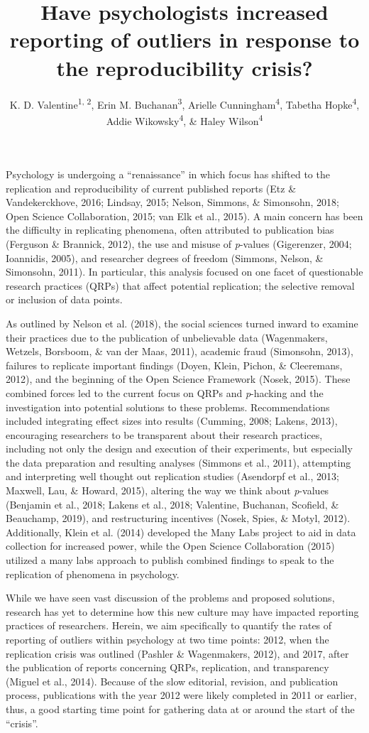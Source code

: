 \documentclass[english,,man]{apa6}
\title{Have psychologists increased reporting of outliers in response to the
reproducibility crisis?}
\author{K. D. Valentine\textsuperscript{1, 2}, Erin M.
Buchanan\textsuperscript{3}, Arielle Cunningham\textsuperscript{4},
Tabetha Hopke\textsuperscript{4}, Addie Wikowsky\textsuperscript{4}, \&
Haley Wilson\textsuperscript{4}}
\date{}
\affiliation{
\vspace{0.5cm}
\textsuperscript{1} Massachusetts General Hospital\\\textsuperscript{2} Harvard Medical School\\\textsuperscript{3} Harrisburg University of Science and Technology\\\textsuperscript{4} Missouri State University}
\theoremstyle{definition}
\theoremstyle{definition}
\theoremstyle{definition}
\theoremstyle{remark}
\begin{document}
\maketitle

Psychology is undergoing a \enquote{renaissance} in which focus has
shifted to the replication and reproducibility of current published
reports (Etz \& Vandekerckhove, 2016; Lindsay, 2015; Nelson, Simmons, \&
Simonsohn, 2018; Open Science Collaboration, 2015; van Elk et al.,
2015). A main concern has been the difficulty in replicating phenomena,
often attributed to publication bias (Ferguson \& Brannick, 2012), the
use and misuse of \emph{p}-values (Gigerenzer, 2004; Ioannidis, 2005),
and researcher degrees of freedom (Simmons, Nelson, \& Simonsohn, 2011).
In particular, this analysis focused on one facet of questionable
research practices (QRPs) that affect potential replication; the
selective removal or inclusion of data points.

As outlined by Nelson et al. (2018), the social sciences turned inward
to examine their practices due to the publication of unbelievable data
(Wagenmakers, Wetzels, Borsboom, \& van der Maas, 2011), academic fraud
(Simonsohn, 2013), failures to replicate important findings (Doyen,
Klein, Pichon, \& Cleeremans, 2012), and the beginning of the Open
Science Framework (Nosek, 2015). These combined forces led to the
current focus on QRPs and \emph{p}-hacking and the investigation into
potential solutions to these problems. Recommendations included
integrating effect sizes into results (Cumming, 2008; Lakens, 2013),
encouraging researchers to be transparent about their research
practices, including not only the design and execution of their
experiments, but especially the data preparation and resulting analyses
(Simmons et al., 2011), attempting and interpreting well thought out
replication studies (Asendorpf et al., 2013; Maxwell, Lau, \& Howard,
2015), altering the way we think about \emph{p}-values (Benjamin et al.,
2018; Lakens et al., 2018; Valentine, Buchanan, Scofield, \& Beauchamp,
2019), and restructuring incentives (Nosek, Spies, \& Motyl, 2012).
Additionally, Klein et al. (2014) developed the Many Labs project to aid
in data collection for increased power, while the Open Science
Collaboration (2015) utilized a many labs approach to publish combined
findings to speak to the replication of phenomena in psychology.

While we have seen vast discussion of the problems and proposed
solutions, research has yet to determine how this new culture may have
impacted reporting practices of researchers. Herein, we aim specifically
to quantify the rates of reporting of outliers within psychology at two
time points: 2012, when the replication crisis was outlined (Pashler \&
Wagenmakers, 2012), and 2017, after the publication of reports
concerning QRPs, replication, and transparency (Miguel et al., 2014).
Because of the slow editorial, revision, and publication process,
publications with the year 2012 were likely completed in 2011 or
earlier, thus, a good starting time point for gathering data at or
around the start of the \enquote{crisis}.
\end{document}
